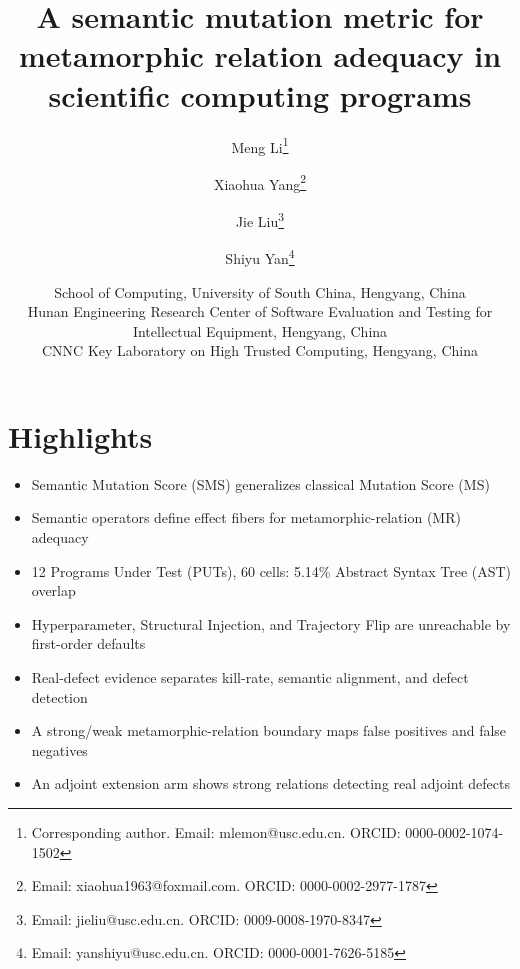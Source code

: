 \documentclass[12pt]{article}
\newenvironment{highlights}{\section*{Highlights}\begin{itemize}}{\end{itemize}}
\begin{document}
\title{A semantic mutation metric for metamorphic relation adequacy in scientific computing programs}
\author{
Meng Li\thanks{Corresponding author. Email: mlemon@usc.edu.cn. ORCID: 0000-0002-1074-1502}
\and Xiaohua Yang\thanks{Email: xiaohua1963@foxmail.com. ORCID: 0000-0002-2977-1787}
\and Jie Liu\thanks{Email: jieliu@usc.edu.cn. ORCID: 0009-0008-1970-8347}
\and Shiyu Yan\thanks{Email: yanshiyu@usc.edu.cn. ORCID: 0000-0001-7626-5185}
}
\date{\small
School of Computing, University of South China, Hengyang, China\\
Hunan Engineering Research Center of Software Evaluation and Testing for Intellectual Equipment, Hengyang, China\\
CNNC Key Laboratory on High Trusted Computing, Hengyang, China}
\maketitle
\begin{highlights}
\item Semantic Mutation Score (SMS) generalizes classical Mutation Score (MS)
\item Semantic operators define effect fibers for metamorphic-relation (MR) adequacy
\item 12 Programs Under Test (PUTs), 60 cells: 5.14\% Abstract Syntax Tree (AST) overlap
\item Hyperparameter, Structural Injection, and Trajectory Flip are unreachable by first-order defaults
\item Real-defect evidence separates kill-rate, semantic alignment, and defect detection
\item A strong/weak metamorphic-relation boundary maps false positives and false negatives
\item An adjoint extension arm shows strong relations detecting real adjoint defects
\end{highlights}
\end{document}
